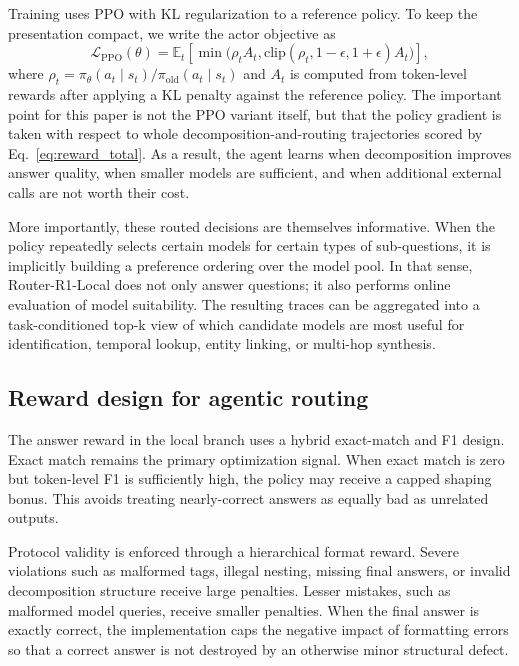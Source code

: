 \documentclass{article}
\begin{document}
Training uses PPO with KL regularization to a reference policy. To keep the presentation compact, we write the actor objective as
\begin{equation}
\mathcal{L}_{\mathrm{PPO}}(\theta) = \mathbb{E}_t \left[ \min\bigl(\rho_t A_t, \mathrm{clip}(\rho_t, 1-\epsilon, 1+\epsilon) A_t\bigr) \right],
\label{eq:ppo}
\end{equation}
where $\rho_t = \pi_\theta(a_t \mid s_t) / \pi_{\mathrm{old}}(a_t \mid s_t)$ and $A_t$ is computed from token-level rewards after applying a KL penalty against the reference policy. The important point for this paper is not the PPO variant itself, but that the policy gradient is taken with respect to whole decomposition-and-routing trajectories scored by Eq.~\ref{eq:reward_total}. As a result, the agent learns when decomposition improves answer quality, when smaller models are sufficient, and when additional external calls are not worth their cost.

More importantly, these routed decisions are themselves informative. When the policy repeatedly selects certain models for certain types of sub-questions, it is implicitly building a preference ordering over the model pool. In that sense, Router-R1-Local does not only answer questions; it also performs online evaluation of model suitability. The resulting traces can be aggregated into a task-conditioned top-k view of which candidate models are most useful for identification, temporal lookup, entity linking, or multi-hop synthesis.

\subsection{Reward design for agentic routing}

The answer reward in the local branch uses a hybrid exact-match and F1 design. Exact match remains the primary optimization signal. When exact match is zero but token-level F1 is sufficiently high, the policy may receive a capped shaping bonus. This avoids treating nearly-correct answers as equally bad as unrelated outputs.

Protocol validity is enforced through a hierarchical format reward. Severe violations such as malformed tags, illegal nesting, missing final answers, or invalid decomposition structure receive large penalties. Lesser mistakes, such as malformed model queries, receive smaller penalties. When the final answer is exactly correct, the implementation caps the negative impact of formatting errors so that a correct answer is not destroyed by an otherwise minor structural defect.
\end{document}
